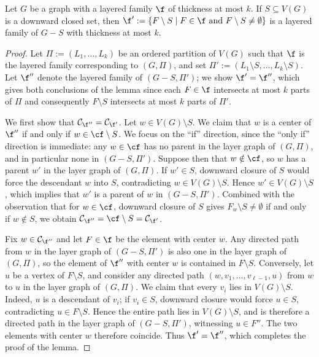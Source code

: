 \begin{lemma}\label{lem:layered_family_minus_downward_closed}
    Let $G$ be a graph with a layered family $\f$ of thickness at most $k$. If $S\subseteq V(G)$ is a downward closed set, then $\f' := \{F \setminus S \mid F \in \f \text{ and } F\setminus S \neq \emptyset\}$ is a layered family of $G - S$ with thickness at most $k$.
\end{lemma}
\begin{proof}
    Let $\Pi := (L_1,\dots,L_k)$ be an ordered partition of $V(G)$ such that $\f$ is the layered family corresponding to $(G,\Pi)$, and set $\Pi' := (L_1\setminus S,\dots,L_k\setminus S)$. Let $\f''$ denote the layered family of $(G - S,\Pi')$; we show $\f' = \f''$, which gives both conclusions of the lemma since each $F\in \f$ intersects at most $k$ parts of $\Pi$ and consequently $F\setminus S$ intersects at most $k$ parts of $\Pi'$.
    
    We first show that $\mathcal{C}_{\f''} = \mathcal{C}_{\f'}$. Let $w \in V(G)\setminus S$. We claim that $w$ is a center of $\f''$ if and only if $w \in \cf \setminus S$. We focus on the ``if'' direction, since the ``only if'' direction is immediate: any $w \in \cf$ has no parent in the layer graph of $(G,\Pi)$, and in particular none in $(G - S,\Pi')$. Suppose then that $w \notin \cf$, so $w$ has a parent $w'$ in the layer graph of $(G,\Pi)$. If $w' \in S$, downward closure of $S$ would force the descendant $w$ into $S$, contradicting $w \in V(G) \setminus S$. Hence $w' \in V(G) \setminus S$, which implies that $w'$ is a parent of $w$ in $(G - S,\Pi')$. Combined with the observation that for $w \in \cf$, downward closure of $S$ gives $F_w \setminus S \neq \emptyset$ if and only if $w \notin S$, we obtain $\mathcal{C}_{\f''} = \cf \setminus S = \mathcal{C}_{\f'}$.
    
    Fix $w\in \mathcal{C}_{\f''}$ and let $F\in\f$ be the element with center $w$. Any directed path from $w$ in the layer graph of $(G - S,\Pi')$ is also one in the layer graph of $(G,\Pi)$, so the element of $\f''$ with center $w$ is contained in $F\setminus S$. Conversely, let $u$ be a vertex of $F\setminus S$, and consider any directed path $(w, v_1, \dots, v_{\ell-1}, u)$ from $w$ to $u$ in the layer graph of $(G,\Pi)$. We claim that every $v_i$ lies in $V(G)\setminus S$. Indeed, $u$ is a descendant of $v_i$; if $v_i\in S$, downward closure would force $u\in S$, contradicting $u\in F\setminus S$. Hence the entire path lies in $V(G)\setminus S$, and is therefore a directed path in the layer graph of $(G - S,\Pi')$, witnessing $u\in F''$. The two elements with center $w$ therefore coincide. Thus $\f' = \f''$, which completes the proof of the lemma. 
\end{proof}

